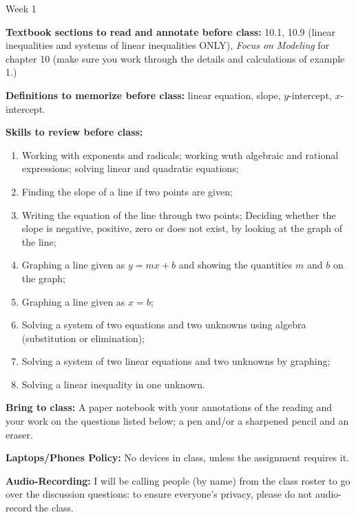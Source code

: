 \documentclass[12pt,dvipsnames]{article}
\begin{document}
\thispagestyle{empty}

	\begin{center}
		{\large{Week 1}}
	\end{center}

{\bfseries{Textbook sections to read and annotate before class:}} 10.1, 10.9 (linear inequalities and systems of linear inequalities ONLY), {\emph{Focus on Modeling}} for chapter 10 (make sure you work through the details and calculations of example 1.)
\smallskip

	{\bfseries{Definitions to memorize before class:}} linear equation, slope, $y$-intercept, $x$-intercept.
\smallskip	
	
{\bfseries{Skills to review before class:} }
	\begin{enumerate} 
		\item Working with exponents and radicals; working wuth algebraic and rational expressions; solving linear and quadratic equations;
		\item Finding the slope of a line if two points are given;
		\item Writing the equation of the line through two points;
		Deciding whether the slope is negative, positive, zero or does not exist, by looking at the graph of the line;
		\item Graphing a line given as $\displaystyle y=mx+b$ and showing the quantities $m$ and $b$ on the graph;
		\item Graphing a line given as $x=b$;
		\item Solving a system of two equations and two unknowns using algebra (substitution or elimination);
		\item Solving a system of two linear equations and two unknowns by graphing;
		\item Solving a linear inequality in one unknown.
	
\end{enumerate}
	
		
{\bfseries{Bring to class:} } A paper notebook with your annotations of the reading and your work on the questions listed below; a pen and/or a sharpened pencil and an eraser.

{\bfseries{Laptops/Phones Policy:}}  No devices in class, unless the assignment requires it.

{\bfseries{Audio-Recording:}} I will be calling people (by name) from the class roster to go over the discussion questions: to ensure everyone's privacy, please do not audio-record the class.
\end{document}
